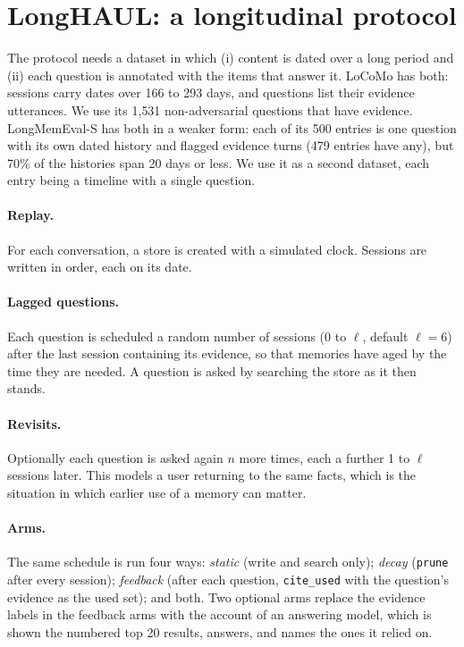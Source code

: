 \documentclass[11pt]{article}
\begin{document}
\section{LongHAUL: a longitudinal protocol}
\label{sec:protocol}

The protocol needs a dataset in which (i) content is dated over a long
period and (ii) each question is annotated with the items that answer
it. LoCoMo has both: sessions carry dates over 166 to 293 days, and
questions list their evidence utterances. We use its 1{,}531
non-adversarial questions that have evidence. LongMemEval-S has both
in a weaker form: each of its 500 entries is one question with its own
dated history and flagged evidence turns (479 entries have any), but
70\% of the histories span 20 days or less. We use it as a second
dataset, each entry being a timeline with a single question.

\paragraph{Replay.} For each conversation, a store is created with a
simulated clock. Sessions are written in order, each on its date.

\paragraph{Lagged questions.} Each question is scheduled a random
number of sessions (0 to $\ell$, default $\ell=6$) after the last
session containing its evidence, so that memories have aged by the
time they are needed. A question is asked by searching the store as it
then stands.

\paragraph{Revisits.} Optionally each question is asked again $n$ more
times, each a further 1 to $\ell$ sessions later. This models a user
returning to the same facts, which is the situation in which earlier
use of a memory can matter.

\paragraph{Arms.} The same schedule is run four ways: \emph{static}
(write and search only); \emph{decay} (\texttt{prune} after every
session); \emph{feedback} (after each question, \texttt{cite\_used}
with the question's evidence as the used set); and both. Two optional
arms replace the evidence labels in the feedback arms with the account
of an answering model, which is shown the numbered top 20 results,
answers, and names the ones it relied on.
\end{document}

